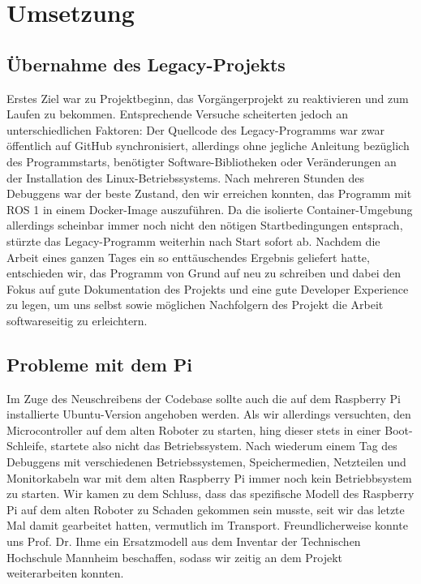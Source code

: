 \section{Umsetzung}

\subsection{Übernahme des Legacy-Projekts}

Erstes Ziel war zu Projektbeginn, das Vorgängerprojekt zu reaktivieren und zum Laufen zu bekommen. Entsprechende Versuche scheiterten jedoch an unterschiedlichen Faktoren: Der Quellcode des Legacy-Programms war zwar öffentlich auf GitHub synchronisiert, allerdings ohne jegliche Anleitung bezüglich des Programmstarts, benötigter Software-Bibliotheken oder Veränderungen an der Installation des Linux-Betriebssystems. Nach mehreren Stunden des Debuggens war der beste Zustand, den wir erreichen konnten, das Programm mit ROS 1 in einem Docker-Image auszuführen. Da die isolierte Container-Umgebung allerdings scheinbar immer noch nicht den nötigen Startbedingungen entsprach, stürzte das Legacy-Programm weiterhin nach Start sofort ab. Nachdem die Arbeit eines ganzen Tages ein so enttäuschendes Ergebnis geliefert hatte, entschieden wir, das Programm von Grund auf neu zu schreiben und dabei den Fokus auf gute Dokumentation des Projekts und eine gute Developer Experience zu legen, um uns selbst sowie möglichen Nachfolgern des Projekt die Arbeit softwareseitig zu erleichtern.

\subsection{Probleme mit dem Pi}

Im Zuge des Neuschreibens der Codebase sollte auch die auf dem Raspberry Pi installierte Ubuntu-Version angehoben werden. Als wir allerdings versuchten, den Microcontroller auf dem alten Roboter zu starten, hing dieser stets in einer Boot-Schleife, startete also nicht das Betriebssystem. Nach wiederum einem Tag des Debuggens mit verschiedenen Betriebssystemen, Speichermedien, Netzteilen und Monitorkabeln war mit dem alten Raspberry Pi immer noch kein Betriebbsystem zu starten. Wir kamen zu dem Schluss, dass das spezifische Modell des Raspberry Pi auf dem alten Roboter zu Schaden gekommen sein musste, seit wir das letzte Mal damit gearbeitet hatten, vermutlich im Transport. Freundlicherweise konnte uns Prof. Dr. Ihme ein Ersatzmodell aus dem Inventar der Technischen Hochschule Mannheim beschaffen, sodass wir zeitig an dem Projekt weiterarbeiten konnten.

